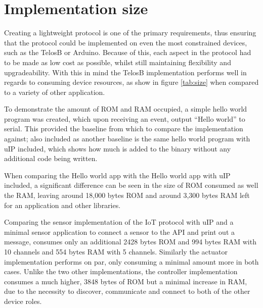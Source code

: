 
\section{Implementation size} %
\label{sec:implementation_size_and_performance}
Creating a lightweight protocol is one of the primary requirements, thus ensuring that the protocol could be implemented on even the most constrained devices, such as the TelosB or Arduino. Because of this, each aspect in the protocol had to be made as low cost as possible, whilst still maintaining flexibility and upgradeability. With this in mind the TelosB implementation performs well in regards to consuming device resources, as show in figure \ref{tab:size} when compared to a variety of other application.

To demonstrate the amount of ROM and RAM occupied, a simple hello world program was created, which upon receiving an event, output ``Hello world'' to serial. This provided the baseline from which to compare the implementation against; also included as another baseline is the same hello world program with uIP included, which shows how much is added to the binary without any additional code being written.

When comparing the Hello world app with the Hello world app with uIP included, a significant difference can be seen in the size of ROM consumed as well the RAM, leaving around 18,000 bytes ROM and around 3,300 bytes RAM left for an application and other libraries.

Comparing the sensor implementation of the IoT protocol with uIP and a minimal sensor application to connect a sensor to the API and print out a message, consumes only an additional 2428 bytes ROM and 994 bytes RAM with 10 channels and 554 bytes RAM with 5 channels.
Similarly the actuator implementation performs on par, only consuming a minimal amount more in both cases. Unlike the two other implementations, the controller implementation consumes a much higher, 3848 bytes of ROM but a minimal increase in RAM, due to the necessity to discover, communicate and connect to both of the other device roles.

